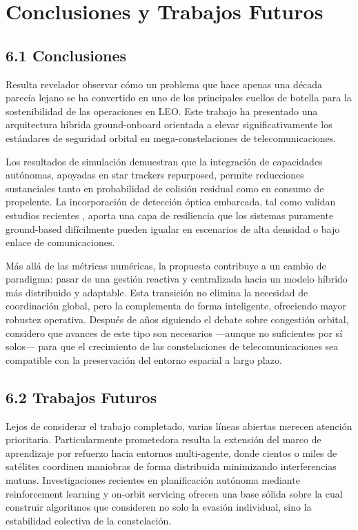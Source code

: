 \section{Conclusiones y Trabajos Futuros}

\subsection{6.1 Conclusiones}

Resulta revelador observar cómo un problema que hace apenas una década parecía lejano se ha convertido en uno de los principales cuellos de botella para la sostenibilidad de las operaciones en LEO. Este trabajo ha presentado una arquitectura híbrida ground-onboard orientada a elevar significativamente los estándares de seguridad orbital en mega-constelaciones de telecomunicaciones.

Los resultados de simulación demuestran que la integración de capacidades autónomas, apoyadas en star trackers repurposed, permite reducciones sustanciales tanto en probabilidad de colisión residual como en consumo de propelente. La incorporación de detección óptica embarcada, tal como validan estudios recientes \cite{campiti2025detectability}, aporta una capa de resiliencia que los sistemas puramente ground-based difícilmente pueden igualar en escenarios de alta densidad o bajo enlace de comunicaciones.

Más allá de las métricas numéricas, la propuesta contribuye a un cambio de paradigma: pasar de una gestión reactiva y centralizada hacia un modelo híbrido más distribuido y adaptable. Esta transición no elimina la necesidad de coordinación global, pero la complementa de forma inteligente, ofreciendo mayor robustez operativa. Después de años siguiendo el debate sobre congestión orbital, considero que avances de este tipo son necesarios —aunque no suficientes por sí solos— para que el crecimiento de las constelaciones de telecomunicaciones sea compatible con la preservación del entorno espacial a largo plazo.

\subsection{6.2 Trabajos Futuros}

Lejos de considerar el trabajo completado, varias líneas abiertas merecen atención prioritaria. Particularmente prometedora resulta la extensión del marco de aprendizaje por refuerzo hacia entornos multi-agente, donde cientos o miles de satélites coordinen maniobras de forma distribuida minimizando interferencias mutuas. Investigaciones recientes en planificación autónoma mediante reinforcement learning y on-orbit servicing \cite{patnala2025oos} ofrecen una base sólida sobre la cual construir algoritmos que consideren no solo la evasión individual, sino la estabilidad colectiva de la constelación.

